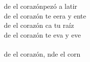 \begin{cancion}
	\begin{chorus}%
	de el corazónpezó a latir  \\
	de el corazón te eera y ente  \\
	de el corazón ca tu raíz  \\
	de el corazón te eva y eve  \\
{}\vspace*{-0.4cm}\\
	de el corazón, nde el corn  \\
	\end{chorus}%
	\jump\\
\end{cancion}%
